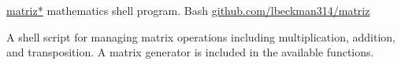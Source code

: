 \showoff
{\href{https://liambeckman.com/projects/matriz}{matriz*}}
{mathematics shell program.}
{Bash}
{\href{https://github.com/lbeckman314/matriz}{github.com/lbeckman314/matriz}}

A shell script for managing matrix operations including multiplication, addition, and transposition. A matrix generator is included in the available functions.

\myBreak
